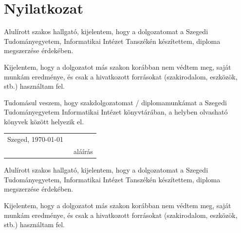 \chapter*{Nyilatkozat}




\noindent
Alulírott \makebox[4cm]{\dotfill} szakos hallgató, kijelentem, hogy a dolgozatomat a Szegedi Tudományegyetem, Informatikai Intézet \makebox[4cm]{\dotfill} Tanszékén készítettem, \makebox[4cm]{\dotfill} diploma megszerzése érdekében.

Kijelentem, hogy a dolgozatot más szakon korábban nem védtem meg, saját munkám eredménye, és csak a hivatkozott forrásokat (szakirodalom, eszközök, stb.) használtam fel.

Tudomásul veszem, hogy szakdolgozatomat / diplomamunkámat a Szegedi Tudományegyetem Informatikai Intézet könyvtárában, a helyben olvasható könyvek között helyezik el.

\vspace*{2cm}

\begin{tabular}{lc}
	Szeged, \today\
	\hspace{2cm} & \makebox[6cm]{\dotfill} \\
	             & aláírás                 \\
\end{tabular}


\vspace*{4cm}


\noindent
Alulírott \makebox[4cm]{\dotfill} szakos hallgató, kijelentem, hogy a dolgozatomat a Szegedi Tudományegyetem, Informatikai Intézet \makebox[4cm]{\dotfill} Tanszékén készítettem, \makebox[4cm]{\dotfill} diploma megszerzése érdekében.

Kijelentem, hogy a dolgozatot más szakon korábban nem védtem meg, saját munkám eredménye, és csak a hivatkozott forrásokat (szakirodalom, eszközök, stb.) használtam fel.

